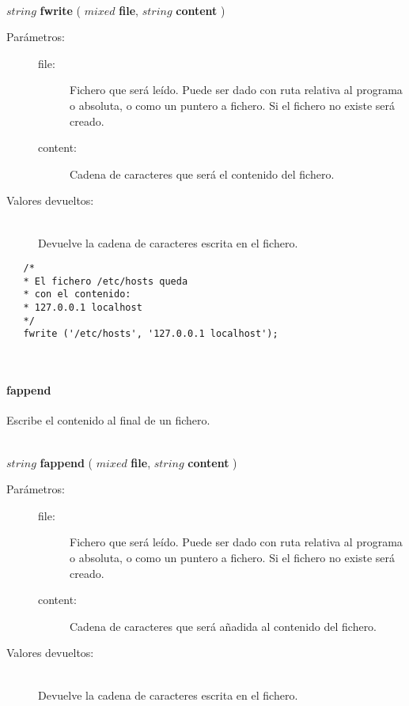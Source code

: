 \hfill \\ $string$ \textbf{fwrite} ( $mixed$ \textbf{file}, $string$ \textbf{content}  )  
\begin{description}
\item [Parámetros:] \hfill 
   \begin{description}
   \item[file:] Fichero que será leído. Puede ser dado con ruta relativa al programa o absoluta, o como un puntero a fichero. 
   Si el fichero no existe será creado.
   \item[content:] Cadena de caracteres que será el contenido del fichero.
   \end{description}
\item[Valores devueltos:] \hfill \\
   Devuelve la cadena de caracteres escrita en el fichero.
\end{description}

\begin{lstlisting}  
   /*
   * El fichero /etc/hosts queda
   * con el contenido:
   * 127.0.0.1 localhost
   */
   fwrite ('/etc/hosts', '127.0.0.1 localhost');
\end{lstlisting}
\hfill\\ 

\paragraph{fappend}
Escribe el contenido al final de un fichero.

\hfill \\ $string$ \textbf{fappend} ( $mixed$ \textbf{file}, $string$ \textbf{content}  )  
\begin{description}
\item [Parámetros:] \hfill 
   \begin{description}
   \item[file:] Fichero que será leído. Puede ser dado con ruta relativa al programa o absoluta, o como un puntero a fichero. 
   Si el fichero no existe será creado.
   \item[content:] Cadena de caracteres que será añadida al contenido del fichero.
   \end{description}
\item[Valores devueltos:] \hfill \\
   Devuelve la cadena de caracteres escrita en el fichero.
\end{description}

